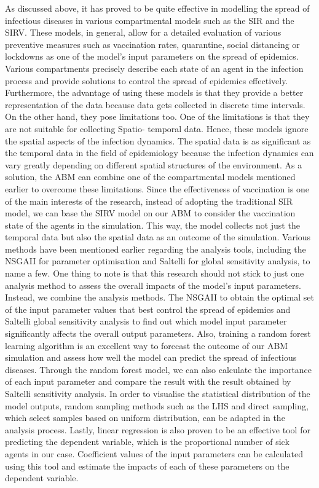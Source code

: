 \documentclass[smallextended]{svjour3}       %
\begin{document}
As discussed above, it has proved to be quite effective in modelling the spread of infectious
diseases in various compartmental models such as the SIR and the SIRV. These models, in
general, allow for a detailed evaluation of various preventive measures such as vaccination
rates, quarantine, social distancing or lockdowns as one of the model's input parameters on the
spread of epidemics. Various compartments precisely describe each state of an agent in the
infection process and provide solutions to control the spread of epidemics effectively.
Furthermore, the advantage of using these models is that they provide a better representation
of the data because data gets collected in discrete time intervals. On the other hand, they pose
limitations too. One of the limitations is that they are not suitable for collecting Spatio-
temporal data. Hence, these models ignore the spatial aspects of the infection dynamics. The
spatial data is as significant as the temporal data in the field of epidemiology because the
infection dynamics can vary greatly depending on different spatial structures of the
environment. As a solution, the ABM can combine one of the compartmental models
mentioned earlier to overcome these limitations. Since the effectiveness of vaccination is one
of the main interests of the research, instead of adopting the traditional SIR model, we can base
the SIRV model on our ABM to consider the vaccination state of the agents in the simulation.
This way, the model collects not just the temporal data but also the spatial data as an outcome
of the simulation.
Various methods have been mentioned earlier regarding the analysis tools, including the
NSGAII for parameter optimisation and Saltelli for global sensitivity analysis, to name a few.
One thing to note is that this research should not stick to just one analysis method to assess the
overall impacts of the model's input parameters. Instead, we combine the analysis methods.
The NSGAII to obtain the optimal set of the input parameter values that best control the spread
of epidemics and Saltelli global sensitivity analysis to find out which model input parameter
significantly affects the overall output parameters. Also, training a random forest learning
algorithm is an excellent way to forecast the outcome of our ABM simulation and assess how
well the model can predict the spread of infectious diseases. Through the random forest model,
we can also calculate the importance of each input parameter and compare the result with the result obtained by Saltelli sensitivity analysis. In order to visualise the statistical distribution of
the model outputs, random sampling methods such as the LHS and direct sampling, which
select samples based on uniform distribution, can be adapted in the analysis process. Lastly,
linear regression is also proven to be an effective tool for predicting the dependent variable,
which is the proportional number of sick agents in our case. Coefficient values of the input
parameters can be calculated using this tool and estimate the impacts of each of these
parameters on the dependent variable.
\end{document}
